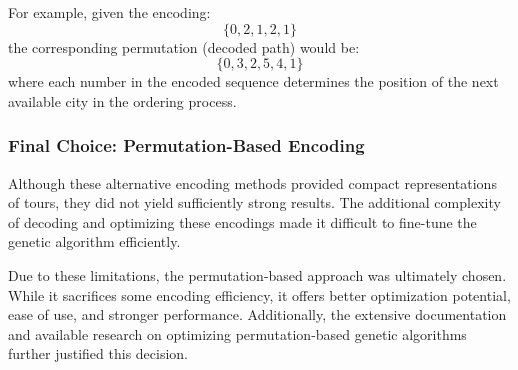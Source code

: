 \documentclass{article}
\begin{document}
For example, given the encoding:  
\[
\{0,2,1,2,1\}
\]  
the corresponding permutation (decoded path) would be:  
\[
\{0,3,2,5,4,1\}
\]  
where each number in the encoded sequence determines the position of the next available city in the ordering process.

\subsubsection{Final Choice: Permutation-Based Encoding}  
Although these alternative encoding methods provided compact representations of tours, they did not yield sufficiently strong results. The additional complexity of decoding and optimizing these encodings made it difficult to fine-tune the genetic algorithm efficiently.  

Due to these limitations, the permutation-based approach was ultimately chosen. While it sacrifices some encoding efficiency, it offers better optimization potential, ease of use, and stronger performance. Additionally, the extensive documentation and available research on optimizing permutation-based genetic algorithms further justified this decision.  
\end{document}
